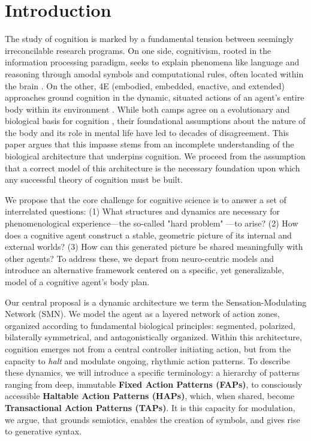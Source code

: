 \section{Introduction}
\label{sec:introduction}
The study of cognition is marked by a fundamental tension between seemingly irreconcilable research programs. On one side, cognitivism, rooted in the information processing paradigm, seeks to explain phenomena like language and reasoning through amodal symbols and computational rules, often located within the brain \cite{chomsky1965aspects, fodor_modularity_1983}. On the other, 4E (embodied, embedded, enactive, and extended) approaches ground cognition in the dynamic, situated actions of an agent's entire body within its environment \cite{varela1991embodied,  maturana1991autopoiesis, noe_action_2004}. While both camps agree on a evolutionary and biological basis for cognition \cite{chomsky1965aspects, varela1991embodied}, their foundational assumptions about the nature of the body and its role in mental life have led to decades of disagreement. This paper argues that this impasse stems from an incomplete understanding of the biological architecture that underpins cognition. We proceed from the assumption that a correct model of this architecture is the necessary foundation upon which any successful theory of cognition must be built.

We propose that the core challenge for cognitive science is to answer a set of interrelated questions: (1) What structures and dynamics are necessary for phenomenological experience—the so-called "hard problem" \cite{chalmers1995facing}—to arise? (2) How does a cognitive agent construct a stable, geometric picture of its internal and external worlds? (3) How can this generated picture be shared meaningfully with other agents? To address these, we depart from neuro-centric models and introduce an alternative framework centered on a specific, yet generalizable, model of a cognitive agent's body plan.

Our central proposal is a dynamic architecture we term the Sensation-Modulating Network (SMN). We model the agent as a layered network of action zones, organized according to fundamental biological principles: segmented, polarized, bilaterally symmetrical, and antagonistically organized. Within this architecture, cognition emerges not from a central controller initiating action, but from the capacity to \textit{halt} and modulate ongoing, rhythmic action patterns. To describe these dynamics, we will introduce a specific terminology: a hierarchy of patterns ranging from deep, immutable \textbf{Fixed Action Patterns (FAPs)}, to consciously accessible \textbf{Haltable Action Patterns (HAPs)}, which, when shared, become \textbf{Transactional Action Patterns (TAPs)}. It is this capacity for modulation, we argue, that grounds semiotics\cite{peirce1992essential}, enables the creation of symbols, and gives rise to generative syntax\cite{chomsky1965aspects}.


